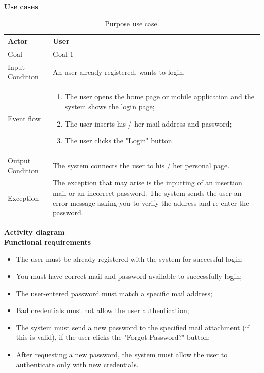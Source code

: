 \documentclass{article}
\begin{document}
	\bigskip
	\noindent
	\textbf{Use cases} \\
	
	\begin{table}[htp]
	\caption{Purpose use case.}
		\begin{center}
    			\begin{tabular}{p{}|p{}}
   			 	\hline
    				Actor & User \\ \hline
    				Goal & Goal 1 \\ \hline
    				Input Condition & An  user already registered, wants to login. \\ \hline
    				Event flow & 
				\begin{enumerate}
  					\item The user opens the home page or mobile application and the system shows the login page;
  					\item The user inserts his / her mail address and password;
  					\item The user clicks the "Login" button.
 				 \end{enumerate} \\ \hline
    				Output Condition & The system connects the user to his / her personal page. \\ \hline
    				Exception &The exception that may arise is the inputting of an insertion mail or an incorrect password. The system sends the user an error message asking you to verify the address and re-enter the password. \\ \hline
    			\end{tabular}
		\end{center}
	\end{table}
	
	\bigskip
	\noindent
	\textbf{Activity diagram} \\
	
	
	\bigskip
	\noindent
	\textbf{Functional requirements} \\
	\begin{itemize}
		\item The user must be already registered with the system for successful login;
		\item You must have correct mail and password available to successfully login;
		\item The user-entered password must match a specific mail address;
		\item Bad credentials must not allow the user authentication;
		\item The system must send a new password to the specified mail attachment (if this is valid), if the user clicks the "Forgot Password?" button;
		\item After requesting a new password, the system must allow the user to authenticate only with new credentials.
	\end{itemize}
\end{document}
